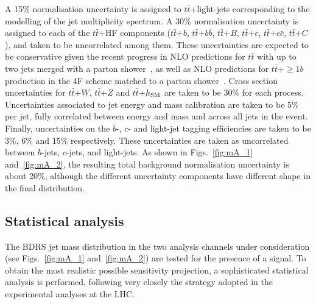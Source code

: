 \documentclass[preprintnumbers,superscriptaddress,nofootinbib,aps,prd,floatfix]{revtex4}
\newcommand{\ttbar}{\ensuremath{t\bar{t}}}
\begin{document}
A 15\% normalisation uncertainty is assigned to $\ttbar$+light-jets corresponding to the modelling of the jet multiplicity 
spectrum. A 30\% normalisation uncertainty is assigned to each of the $\ttbar$+HF components ($\ttbar$+$b$, 
$\ttbar$+$b\bar{b}$, $\ttbar$+$B$, $\ttbar$+$c$, $\ttbar$+$c\bar{c}$, $\ttbar$+$C$), and taken to be uncorrelated among 
them. These uncertainties are expected to be conservative given the recent progress in NLO predictions for $\ttbar$ with
up to two jets merged with a parton shower~\cite{Hoeche:2014qda}, as well as NLO predictions for $\ttbar$+$\geq 1b$ production 
in the 4F scheme matched to a parton shower~\cite{Cascioli:2013era}. Cross section uncertainties for $\ttbar$+$W$, $\ttbar$+$Z$ and
$\ttbar$+$h_{\rm SM}$ are taken to be 30\% for each process. Uncertainties associated to jet energy and mass calibration are taken
to be 5\% per jet, fully correlated between energy and mass and across all jets in the event. Finally, uncertainties on the
$b$-, $c$- and light-jet tagging efficiencies are taken to be 3\%, 6\% and 15\% respectively. These uncertainties are taken 
as uncorrelated between $b$-jets, $c$-jets, and light-jets. 
As shown in Figs.~\ref{fig:mA_1} and~\ref{fig:mA_2}, the resulting total background normalisation uncertainty is about 20\%, 
although the different uncertainty components have different shape in the final distribution.

\subsection{Statistical analysis}
\label{sec:stat_analysis}

The BDRS jet mass distribution in the two analysis channels 
under consideration (see Figs.~\ref{fig:mA_1} and~\ref{fig:mA_2}) are tested for the presence of
a signal. To obtain the most realistic possible sensitivity projection, a sophisticated statistical analysis   
is performed, following very closely the strategy adopted in the experimental analyses at the LHC.
\end{document}
